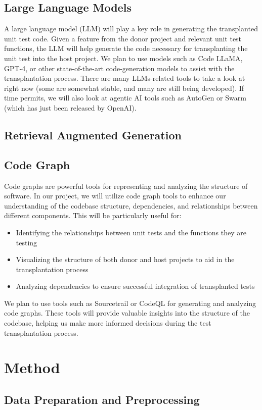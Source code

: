 \documentclass[sigconf]{acmart}
\begin{document}
\subsection{Large Language Models}
A large language model (LLM) will play a key role in generating the transplanted unit test code. Given a feature from the donor project and relevant unit test functions, the LLM will help generate the code necessary for transplanting the unit test into the host project. We plan to use models such as Code LLaMA, GPT-4, or other state-of-the-art code-generation models to assist with the transplantation process. There are many LLMs-related tools to take a look at right now (some are somewhat stable, and many are still being developed). If time permits, we will also look at agentic AI tools such as AutoGen or Swarm (which has just been released by OpenAI).
\subsection{Retrieval Augmented Generation}

\subsection{Code Graph}
Code graphs are powerful tools for representing and analyzing the structure of software. In our project, we will utilize code graph tools to enhance our understanding of the codebase structure, dependencies, and relationships between different components. This will be particularly useful for:
\begin{itemize}
\item Identifying the relationships between unit tests and the functions they are testing
\item Visualizing the structure of both donor and host projects to aid in the transplantation process
\item Analyzing dependencies to ensure successful integration of transplanted tests
\end{itemize}
We plan to use tools such as Sourcetrail or CodeQL for generating and analyzing code graphs. These tools will provide valuable insights into the structure of the codebase, helping us make more informed decisions during the test transplantation process.


\section{Method}
\subsection{Data Preparation and Preprocessing}
\end{document}
